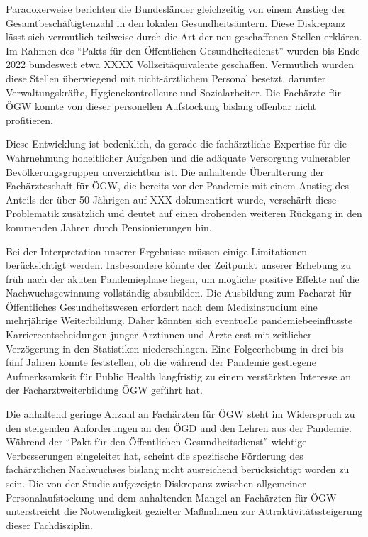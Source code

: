 \documentclass[
  ngerman,
  number,
  preprint,
  3p,
  twocolumn]{elsarticle}
\begin{document}
Paradoxerweise berichten die Bundesländer gleichzeitig von einem Anstieg
der Gesamtbeschäftigtenzahl in den lokalen Gesundheitsämtern. Diese
Diskrepanz lässt sich vermutlich teilweise durch die Art der neu
geschaffenen Stellen erklären. Im Rahmen des ``Pakts für den
Öffentlichen Gesundheitsdienst'' wurden bis Ende 2022 bundesweit etwa
XXXX Vollzeitäquivalente geschaffen. Vermutlich wurden diese Stellen
überwiegend mit nicht-ärztlichem Personal besetzt, darunter
Verwaltungskräfte, Hygienekontrolleure und Sozialarbeiter. Die Fachärzte
für ÖGW konnte von dieser personellen Aufstockung bislang offenbar nicht
profitieren.

Diese Entwicklung ist bedenklich, da gerade die fachärztliche Expertise
für die Wahrnehmung hoheitlicher Aufgaben und die adäquate Versorgung
vulnerabler Bevölkerungsgruppen unverzichtbar ist. Die anhaltende
Überalterung der Fachärzteschaft für ÖGW, die bereits vor der Pandemie
mit einem Anstieg des Anteils der über 50-Jährigen auf XXX dokumentiert
wurde, verschärft diese Problematik zusätzlich und deutet auf einen
drohenden weiteren Rückgang in den kommenden Jahren durch
Pensionierungen hin.

Bei der Interpretation unserer Ergebnisse müssen einige Limitationen
berücksichtigt werden. Insbesondere könnte der Zeitpunkt unserer
Erhebung zu früh nach der akuten Pandemiephase liegen, um mögliche
positive Effekte auf die Nachwuchsgewinnung vollständig abzubilden. Die
Ausbildung zum Facharzt für Öffentliches Gesundheitswesen erfordert nach
dem Medizinstudium eine mehrjährige Weiterbildung. Daher könnten sich
eventuelle pandemiebeeinflusste Karriereentscheidungen junger Ärztinnen
und Ärzte erst mit zeitlicher Verzögerung in den Statistiken
niederschlagen. Eine Folgeerhebung in drei bis fünf Jahren könnte
feststellen, ob die während der Pandemie gestiegene Aufmerksamkeit für
Public Health langfristig zu einem verstärkten Interesse an der
Facharztweiterbildung ÖGW geführt hat.

Die anhaltend geringe Anzahl an Fachärzten für ÖGW steht im Widerspruch
zu den steigenden Anforderungen an den ÖGD und den Lehren aus der
Pandemie. Während der ``Pakt für den Öffentlichen Gesundheitsdienst''
wichtige Verbesserungen eingeleitet hat, scheint die spezifische
Förderung des fachärztlichen Nachwuchses bislang nicht ausreichend
berücksichtigt worden zu sein. Die von der Studie aufgezeigte Diskrepanz
zwischen allgemeiner Personalaufstockung und dem anhaltenden Mangel an
Fachärzten für ÖGW unterstreicht die Notwendigkeit gezielter Maßnahmen
zur Attraktivitätssteigerung dieser Fachdisziplin.
\end{document}
